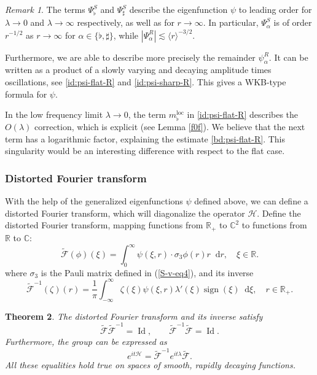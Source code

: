 \documentclass[11 pt]{amsart}
\newcommand{\tmop}[1]{\ensuremath{\operatorname{#1}}}
\newtheorem{thm}{Theorem}[section]
\theoremstyle{definition}
\theoremstyle{remark}
\newtheorem{rem}[thm]{Remark}
\numberwithin{equation}{section}
\newcommand{\dd}{\mathop{}\!\mathrm{d}}
\begin{document}
\begin{rem}

The terms $\Psi^S_\flat$ and $\Psi^S_\sharp$ describe the eigenfunction $\psi$ to leading order for $\lambda \to 0$ and $\lambda \to \infty$ respectively, as well as for $r\to \infty$. In particular, $\Psi^S_\alpha$ is of order $r^{-1/2}$ as $r\to \infty$ for $\alpha \in \{\flat, \sharp\}$, while $|\Psi^R_\alpha|\lesssim \langle r\rangle^{-3/2}$.

Furthermore, we are able to describe more precisely the remainder $\psi^R_\alpha$. It can be written as a product of a slowly varying and decaying amplitude times oscillations, see \eqref{id:psi-flat-R} and \eqref{id:psi-sharp-R}. This gives a WKB-type formula for $\psi$.

In the low frequency limit $\lambda \to 0$, the term $m_{\flat}^{\tmop{loc}}$ in \eqref{id:psi-flat-R} describes the $O(\lambda)$ correction, which is explicit (see Lemma \ref{f0f}). We believe that the next term has a logarithmic factor, explaining the estimate \eqref{bd:psi-flat-R}. This singularity would be an interesting difference with respect to the flat case.
\end{rem}

\subsubsection{Distorted Fourier transform}
With the help of the generalized eigenfunctions $\psi$ defined above, we can define a distorted Fourier transform, which will diagonalize the operator $\mathcal{H}$.
Define the distorted Fourier transform, mapping functions from $\mathbb{R}_+$ to $\mathbb{C}^2$ to functions from $\mathbb{R}$ to $\mathbb{C}$:
$$
\widetilde{\mathcal{F}}(\phi)(\xi) = \int_0^\infty \psi(\xi,r) \cdot \sigma_3 \phi (r) r \dd r, \quad \xi \in \mathbb{R}.
$$
where $\sigma_3$ is the Pauli matrix defined in (\ref{S-v-eq4}),
and its inverse
$$
\widetilde{\mathcal{F}}^{-1}(\zeta) (r)= \frac 1 \pi \int_{-\infty}^\infty \zeta(\xi) \psi(\xi,r) \lambda'(\xi) \operatorname{sign} (\xi) \dd \xi, \quad r \in \mathbb{R}_+.
$$

\begin{thm}
The distorted Fourier transform and its inverse satisfy
$$
\widetilde{\mathcal{F}} \widetilde{\mathcal{F}}^{-1} = \operatorname{Id}, \qquad \widetilde{\mathcal{F}}^{-1} \widetilde{\mathcal{F}} = \operatorname{Id}.
$$
Furthermore, the group can be expressed as
\begin{equation} \label{formula-group}
e^{it\mathcal{H}} = \widetilde{\mathcal{F}}^{-1} e^{it \lambda} \widetilde{\mathcal{F}}.
\end{equation}
All these equalities hold true on spaces of smooth, rapidly decaying functions.
\end{thm}
\end{document}
